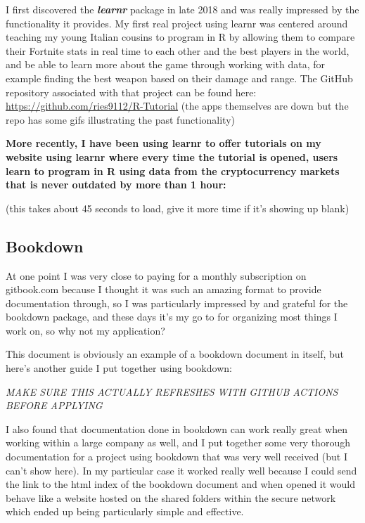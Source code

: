 \documentclass[
]{book}
\begin{document}
I first discovered the \textbf{\emph{learnr}} \citep{R-learnr} package in late 2018 and was really impressed by the functionality it provides. My first real project using learnr was centered around teaching my young Italian cousins to program in R by allowing them to compare their Fortnite stats in real time to each other and the best players in the world, and be able to learn more about the game through working with data, for example finding the best weapon based on their damage and range. The GitHub repository associated with that project can be found here: \url{https://github.com/ries9112/R-Tutorial} (the apps themselves are down but the repo has some gifs illustrating the past functionality)

\textbf{More recently, I have been using learnr to offer tutorials on my website using learnr where every time the tutorial is opened, users learn to program in R using data from the cryptocurrency markets that is never outdated by more than 1 hour:}

(this takes about 45 seconds to load, give it more time if it's showing up blank)

\hypertarget{bookdown}{%
\subsection{Bookdown}\label{bookdown}}

At one point I was very close to paying for a monthly subscription on gitbook.com because I thought it was such an amazing format to provide documentation through, so I was particularly impressed by and grateful for the bookdown \citep{R-bookdown} package, and these days it's my go to for organizing most things I work on, so why not my application?

This document is obviously an example of a bookdown document in itself, but here's another guide I put together using bookdown:

\emph{MAKE SURE THIS ACTUALLY REFRESHES WITH GITHUB ACTIONS BEFORE APPLYING}

I also found that documentation done in bookdown can work really great when working within a large company as well, and I put together some very thorough documentation for a project using bookdown that was very well received (but I can't show here). In my particular case it worked really well because I could send the link to the html index of the bookdown document and when opened it would behave like a website hosted on the shared folders within the secure network which ended up being particularly simple and effective.
\end{document}
